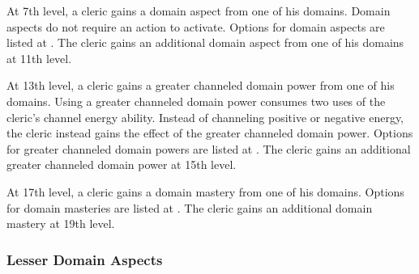  At 7th level, a cleric gains a domain aspect from one of his domains. Domain aspects do not require an action to activate. Options for domain aspects are listed at .  The cleric gains an additional domain aspect from one of his domains at 11th level.

 At 13th level, a cleric gains a greater channeled domain power from one of his domains. Using a greater channeled domain power consumes two uses of the cleric's channel energy ability. Instead of channeling positive or negative energy, the cleric instead gains the effect of the greater channeled domain power. Options for greater channeled domain powers are listed at .  The cleric gains an additional greater channeled domain power at 15th level.

 At 17th level, a cleric gains a domain mastery from one of his domains. Options for domain masteries are listed at .  The cleric gains an additional domain mastery at 19th level.


\subsubsection{Lesser Domain Aspects}\label{Lesser Domain Aspects}

